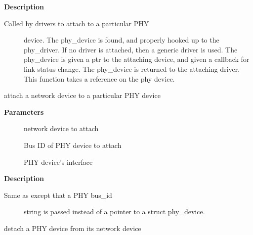 \documentclass[a4paper,8pt,english]{sphinxmanual}
\begin{document}
\textbf{Description}
\begin{description}
\item[{Called by drivers to attach to a particular PHY}] \leavevmode
device. The phy\_device is found, and properly hooked up
to the phy\_driver.  If no driver is attached, then a
generic driver is used.  The phy\_device is given a ptr to
the attaching device, and given a callback for link status
change.  The phy\_device is returned to the attaching driver.
This function takes a reference on the phy device.

\end{description}

\begin{fulllineitems}
\label{networking/kapi:c.phy_attach}
attach a network device to a particular PHY device

\end{fulllineitems}


\textbf{Parameters}
\begin{description}
\item[{}] \leavevmode
network device to attach

\item[{}] \leavevmode
Bus ID of PHY device to attach

\item[{}] \leavevmode
PHY device's interface

\end{description}

\textbf{Description}
\begin{description}
\item[{Same as {\hyperref[networking/kapi:c.phy_attach_direct]{\emph{}}} except that a PHY bus\_id}] \leavevmode
string is passed instead of a pointer to a struct phy\_device.

\end{description}

\begin{fulllineitems}
\label{networking/kapi:c.phy_detach}
detach a PHY device from its network device

\end{fulllineitems}
\end{document}
